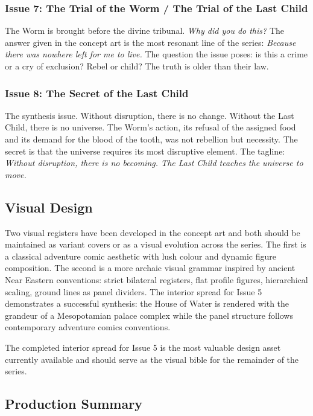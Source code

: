 \documentclass[12pt, a4paper]{article}
\begin{document}
\subsubsection{Issue 7: The Trial of the Worm / The Trial of the Last Child}

The Worm is brought before the divine tribunal. \textit{Why did you do this?} The answer given in the concept art is the most resonant line of the series: \textit{Because there was nowhere left for me to live.} The question the issue poses: is this a crime or a cry of exclusion? Rebel or child? The truth is older than their law.

\subsubsection{Issue 8: The Secret of the Last Child}

The synthesis issue. Without disruption, there is no change. Without the Last Child, there is no universe. The Worm's action, its refusal of the assigned food and its demand for the blood of the tooth, was not rebellion but necessity. The secret is that the universe requires its most disruptive element. The tagline: \textit{Without disruption, there is no becoming. The Last Child teaches the universe to move.}

\subsection{Visual Design}

Two visual registers have been developed in the concept art and both should be maintained as variant covers or as a visual evolution across the series. The first is a classical adventure comic aesthetic with lush colour and dynamic figure composition. The second is a more archaic visual grammar inspired by ancient Near Eastern conventions: strict bilateral registers, flat profile figures, hierarchical scaling, ground lines as panel dividers. The interior spread for Issue 5 demonstrates a successful synthesis: the House of Water is rendered with the grandeur of a Mesopotamian palace complex while the panel structure follows contemporary adventure comics conventions.

The completed interior spread for Issue 5 is the most valuable design asset currently available and should serve as the visual bible for the remainder of the series.

\subsection{Production Summary}
\end{document}
